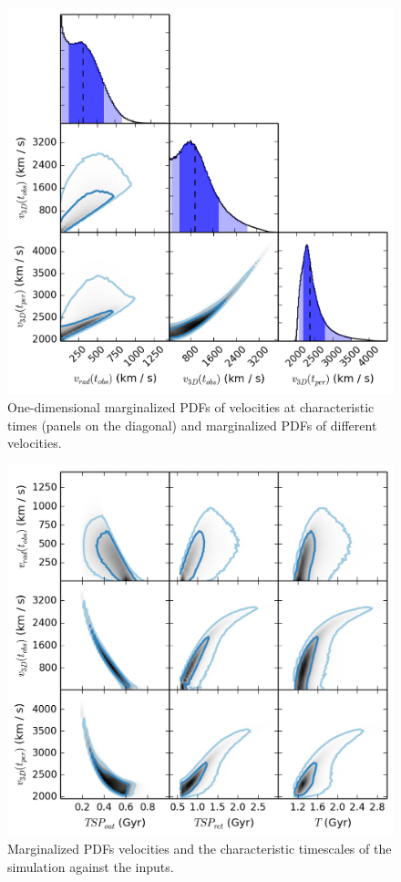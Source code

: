 \documentclass[letterpaper,useAMS,usenatbib]{mn2e}
\begin{document}
\begin{figure}
\begin{minipage}{180mm}
	\begin{center}
	\includegraphics[width=0.5\linewidth]{TwoMnWBSG_tri_vel.png}
	\caption{One-dimensional marginalized PDFs of velocities at
	characteristic times (panels on the diagonal) and marginalized PDFs of
different velocities.}
	\end{center}
\end{minipage}
\end{figure}
\begin{figure}
\begin{minipage}{180mm}
	\begin{center}
	\includegraphics[width=0.5\linewidth]{TwoMnWBSG_velVStime.png}
	\caption{Marginalized PDFs velocities and the characteristic timescales
	of the simulation against the inputs.}
	\end{center}
\end{minipage}
\end{figure}
\end{document}
